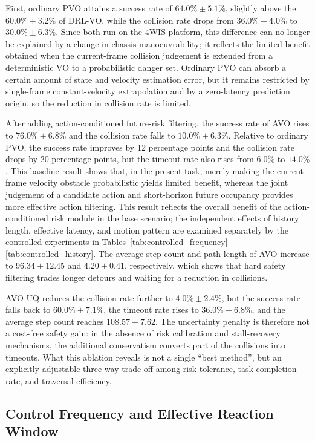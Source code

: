 \documentclass[10pt,a4paper,twocolumn]{article}
\begin{document}
First, ordinary PVO attains a success rate of $64.0\%\pm5.1\%$, slightly above the $60.0\%\pm3.2\%$ of DRL-VO, while the collision rate drops from $36.0\%\pm4.0\%$ to $30.0\%\pm6.3\%$. Since both run on the 4WIS platform, this difference can no longer be explained by a change in chassis manoeuvrability; it reflects the limited benefit obtained when the current-frame collision judgement is extended from a deterministic VO to a probabilistic danger set. Ordinary PVO can absorb a certain amount of state and velocity estimation error, but it remains restricted by single-frame constant-velocity extrapolation and by a zero-latency prediction origin, so the reduction in collision rate is limited.

After adding action-conditioned future-risk filtering, the success rate of AVO rises to $76.0\%\pm6.8\%$ and the collision rate falls to $10.0\%\pm6.3\%$. Relative to ordinary PVO, the success rate improves by 12 percentage points and the collision rate drops by 20 percentage points, but the timeout rate also rises from $6.0\%$ to $14.0\%$. This baseline result shows that, in the present task, merely making the current-frame velocity obstacle probabilistic yields limited benefit, whereas the joint judgement of a candidate action and short-horizon future occupancy provides more effective action filtering. This result reflects the overall benefit of the action-conditioned risk module in the base scenario; the independent effects of history length, effective latency, and motion pattern are examined separately by the controlled experiments in Tables~\ref{tab:controlled_frequency}--\ref{tab:controlled_history}. The average step count and path length of AVO increase to $96.34\pm12.45$ and $4.20\pm0.41$, respectively, which shows that hard safety filtering trades longer detours and waiting for a reduction in collisions.

AVO-UQ reduces the collision rate further to $4.0\%\pm2.4\%$, but the success rate falls back to $60.0\%\pm7.1\%$, the timeout rate rises to $36.0\%\pm6.8\%$, and the average step count reaches $108.57\pm7.62$. The uncertainty penalty is therefore not a cost-free safety gain: in the absence of risk calibration and stall-recovery mechanisms, the additional conservatism converts part of the collisions into timeouts. What this ablation reveals is not a single ``best method'', but an explicitly adjustable three-way trade-off among risk tolerance, task-completion rate, and traversal efficiency.

\subsection{Control Frequency and Effective Reaction Window}
\end{document}

